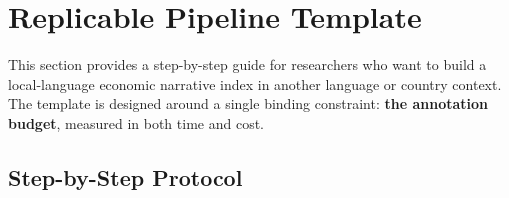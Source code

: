 
\section{Replicable Pipeline Template}\label{sec:template}

This section provides a step-by-step guide for researchers who want to build a local-language economic narrative index in another language or country context. The template is designed around a single binding constraint: \textbf{the annotation budget}, measured in both time and cost.

\subsection{Step-by-Step Protocol}

